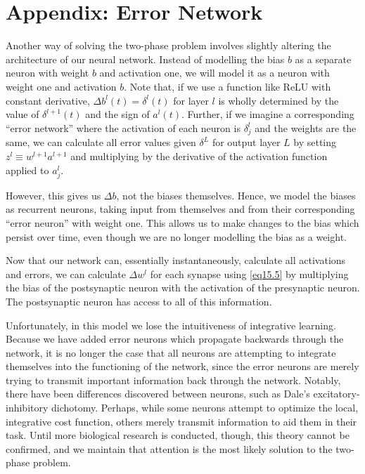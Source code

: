 \documentclass[12pt]{article}
\begin{document}
\section{Appendix: Error Network}
Another way of solving the two-phase problem involves slightly altering the architecture of our neural network. Instead of modelling the bias $b$ as a separate neuron with weight $b$ and activation one, we will model it as a neuron with weight one and activation $b$. Note that, if we use a function like ReLU with constant derivative, $\Delta b^l(t) = \delta^l(t)$ for layer $l$ is wholly determined by the value of $\delta^{l+1}(t)$ and the sign of $a^l(t)$. Further, if we imagine a corresponding ``error network'' where the activation of each neuron is $\delta^l_j$ and the weights are the same, we can calculate all error values given $\delta^L$ for output layer $L$ by setting $z^l \equiv w^{l+1} a^{l+1}$ and multiplying by the derivative of the activation function applied to $a_j^l$.
 
 However, this gives us $\Delta b$, not the biases themselves. Hence, we model the biases as recurrent neurons, taking input from themselves and from their corresponding ``error neuron'' with weight one. This allows us to make changes to the bias which persist over time, even though we are no longer modelling the bias as a weight.
 
Now that our network can, essentially instantaneously, calculate all activations and errors, we can calculate $\Delta w^l$ for each synapse using \ref{eq15.5} by multiplying the bias of the postsynaptic neuron with the activation of the presynaptic neuron. The postsynaptic neuron has access to all of this information.

Unfortunately, in this model we lose the intuitiveness of integrative learning. Because we have added error neurons which propagate backwards through the network, it is no longer the case that all neurons are attempting to integrate themselves into the functioning of the network, since the error neurons are merely trying to transmit important information back through the network. Notably, there have been differences discovered between neurons, such as Dale's excitatory-inhibitory dichotomy. \cite{Dale1953} Perhaps, while some neurons attempt to optimize the local, integrative cost function, others merely transmit information to aid them in their task. Until more biological research is conducted, though, this theory cannot be confirmed, and we maintain that attention is the most likely solution to the two-phase problem.





\end{document}
